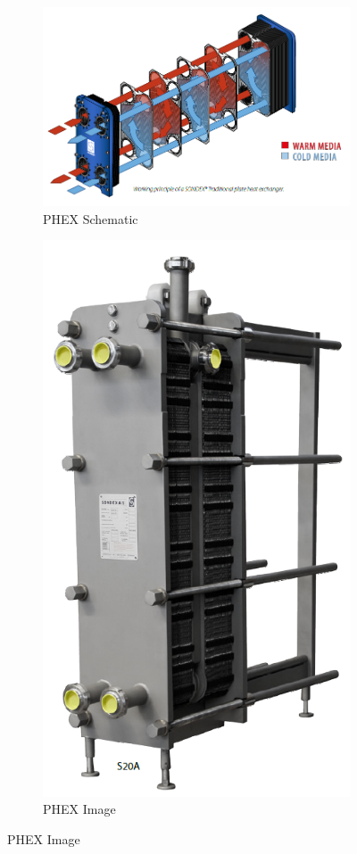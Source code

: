\begin{figure}[H]
    \centering
    \begin{subfigure}{0.49\linewidth}
        \includegraphics[width=\linewidth]{chapters/Z-support/figures/hex_schematic.png}
        \caption{PHEX Schematic }%
    \end{subfigure}
    \begin{subfigure}{0.49\linewidth}
        \includegraphics[width=0.49\linewidth]{chapters/Z-support/figures/hex_diagram.png}
        \caption{PHEX Image } %
    \end{subfigure}
\end{figure}

